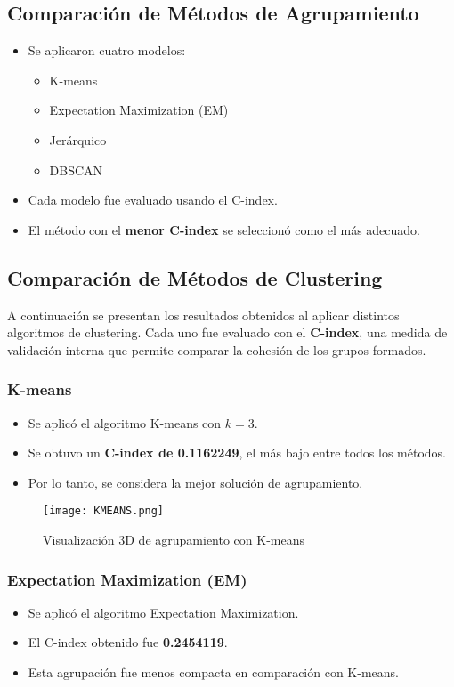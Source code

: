 \documentclass[12pt]{report}
\begin{document}
\subsection{Comparación de Métodos de Agrupamiento}
\begin{itemize}
    \item Se aplicaron cuatro modelos:
    \begin{itemize}
        \item K-means
        \item Expectation Maximization (EM)
        \item Jerárquico
        \item DBSCAN
    \end{itemize}
    \item Cada modelo fue evaluado usando el C-index.
    \item El método con el \textbf{menor C-index} se seleccionó como el más adecuado.
\end{itemize}
\newpage
\subsection{Comparación de Métodos de Clustering}

A continuación se presentan los resultados obtenidos al aplicar distintos algoritmos de clustering. Cada uno fue evaluado con el \textbf{C-index}, una medida de validación interna que permite comparar la cohesión de los grupos formados.

\subsubsection{K-means}
\begin{itemize}
    \item Se aplicó el algoritmo K-means con $k = 3$.
    \item Se obtuvo un \textbf{C-index de 0.1162249}, el más bajo entre todos los métodos.
    \item Por lo tanto, se considera la mejor solución de agrupamiento.
\end{itemize}

\begin{figure}[H]
    \centering
    \texttt{[image: KMEANS.png]}
    \caption{Visualización 3D de agrupamiento con K-means}
\end{figure}
\newpage
\subsubsection{Expectation Maximization (EM)}
\begin{itemize}
    \item Se aplicó el algoritmo Expectation Maximization.
    \item El C-index obtenido fue \textbf{0.2454119}.
    \item Esta agrupación fue menos compacta en comparación con K-means.
\end{itemize}
\end{document}
